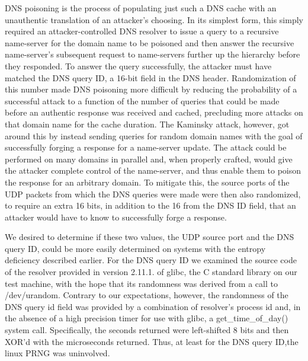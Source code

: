 DNS poisoning is the process of populating just such a DNS cache with an unauthentic translation of an attacker's choosing.  In its simplest form, this simply required an attacker-controlled DNS resolver to issue a query to a recursive name-server for the domain name to be poisoned and then answer the recursive name-server's subsequent request to name-servers further up the hierarchy before they responded.  To answer the query successfully, the attacker must have matched the DNS query ID, a 16-bit field in the DNS header.  Randomization of this number made DNS poisoning more difficult by reducing the probability of a successful attack to a function of the number of queries that could be made before an authentic response was received and cached, precluding more attacks on that domain name for the cache duration.  The Kaminsky attack, however, got around this by instead sending queries for random domain names with the goal of successfully forging a response for a name-server update\cite{kaminsky}.  The attack could be performed on many domains in parallel and, when properly crafted, would give the attacker complete control of the name-server, and thus enable them to poison the response for an arbitrary domain.  To mitigate this, the source ports of the UDP packets from which the DNS queries were made were then also randomized, to require an extra 16 bits, in addition to the 16 from the DNS ID field, that an attacker would have to know to successfully forge a response.

We desired to determine if these two values, the UDP source port and the DNS query ID, could be more easily determined on systems with the entropy deficiency described earlier.  For the DNS query ID we examined the source code of the resolver provided in version 2.11.1. of glibc, the C standard library on our test machine, with the hope that its randomness was derived from a call to /dev/urandom.  Contrary to our expectations, however, the randomness of the DNS query id field was provided by a combination of resolver's process id and, in the absence of a high precision timer for use with glibc, a get\_time\_of\_day() system call.  Specifically, the seconds returned were left-shifted 8 bits and then XOR'd with the microseconds returned.  Thus, at least for the DNS query ID,the linux PRNG was uninvolved.

